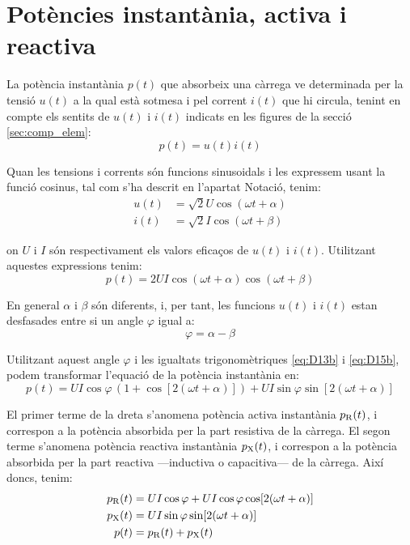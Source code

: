 \section{Potències instantània, activa i reactiva}\label{sec:pot-inst-act-react}

La potència instantània $p(t)$ que absorbeix una càrrega ve determinada per la tensió $u(t)$ a la qual està sotmesa i pel corrent $i(t)$ que hi circula, tenint en compte els sentits de $u(t)$ i $i(t)$ indicats en les figures de la secció \ref{sec:comp_elem}:
\begin{equation}
   p(t) = u(t) i(t)
\end{equation}

Quan les tensions i corrents són funcions sinusoidals i les expressem usant la funció cosinus, tal com s'ha descrit en l'apartat Notació, tenim:
\begin{align}
  u(t) &= \sqrt{2} U \cos(\omega t + \alpha) \\
  i(t) &= \sqrt{2} I \cos(\omega t + \beta)
\end{align}

on $U$ i $I$ són respectivament els valors eficaços de $u(t)$ i $i(t)$. Utilitzant aquestes expressions tenim:
\begin{equation}
   p(t) = 2 U I \cos(\omega t + \alpha) \cos(\omega t + \beta)
\end{equation}

En general $\alpha$ i $\beta$ són diferents, i, per tant, les funcions $u(t)$ i $i(t)$ estan desfasades entre si un angle $\varphi$ igual a:
\begin{equation}
  \varphi = \alpha - \beta
\end{equation}

Utilitzant aquest angle $\varphi$ i les igualtats trigonomètriques \eqref{eq:D13b} i \eqref{eq:D15b}, podem transformar l'equació de la potència instantània en:
\begin{equation}
   p(t) = U I \cos\varphi \,(1 + \cos [2 (\omega t + \alpha)]) + U I \sin\varphi \sin[2 (\omega t + \alpha)]
\end{equation}

El primer terme de la dreta  s'anomena potència activa instantània $p_\mathrm{R}(t)$, i correspon a la potència absorbida per la part resistiva de la càrrega. El segon terme  s'anomena potència reactiva instantània $p_\mathrm{X}(t)$, i correspon a la potència absorbida per la part reactiva ---inductiva o capacitiva--- de la càrrega. Així doncs, tenim:
\begin{subequations}
\begin{align}
  p_\mathrm{R}(t) &=  U I \cos\varphi + U I \cos\varphi \cos [2 (\omega t + \alpha)] \\
  p_\mathrm{X}(t) &=  U I \sin\varphi \sin[2 (\omega t + \alpha)] \\
    p(t) &= p_\mathrm{R}(t) + p_\mathrm{X}(t)
\end{align}
\end{subequations}
	
